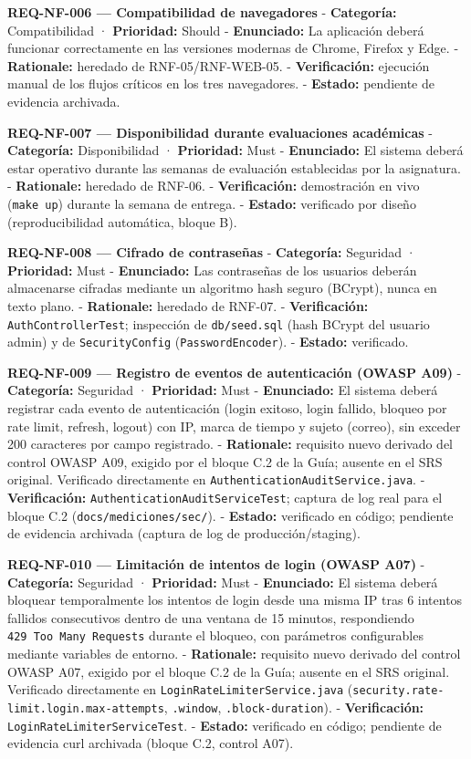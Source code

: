 \documentclass[
]{article}
\begin{document}
\textbf{REQ-NF-006 --- Compatibilidad de navegadores} -
\textbf{Categoría:} Compatibilidad · \textbf{Prioridad:} Should -
\textbf{Enunciado:} La aplicación deberá funcionar correctamente en las
versiones modernas de Chrome, Firefox y Edge. - \textbf{Rationale:}
heredado de RNF-05/RNF-WEB-05. - \textbf{Verificación:} ejecución manual
de los flujos críticos en los tres navegadores. - \textbf{Estado:}
pendiente de evidencia archivada.

\textbf{REQ-NF-007 --- Disponibilidad durante evaluaciones académicas} -
\textbf{Categoría:} Disponibilidad · \textbf{Prioridad:} Must -
\textbf{Enunciado:} El sistema deberá estar operativo durante las
semanas de evaluación establecidas por la asignatura. -
\textbf{Rationale:} heredado de RNF-06. - \textbf{Verificación:}
demostración en vivo (\texttt{make\ up}) durante la semana de entrega. -
\textbf{Estado:} verificado por diseño (reproducibilidad automática,
bloque B).

\textbf{REQ-NF-008 --- Cifrado de contraseñas} - \textbf{Categoría:}
Seguridad · \textbf{Prioridad:} Must - \textbf{Enunciado:} Las
contraseñas de los usuarios deberán almacenarse cifradas mediante un
algoritmo hash seguro (BCrypt), nunca en texto plano. -
\textbf{Rationale:} heredado de RNF-07. - \textbf{Verificación:}
\texttt{AuthControllerTest}; inspección de \texttt{db/seed.sql} (hash
BCrypt del usuario admin) y de \texttt{SecurityConfig}
(\texttt{PasswordEncoder}). - \textbf{Estado:} verificado.

\textbf{REQ-NF-009 --- Registro de eventos de autenticación (OWASP A09)}
- \textbf{Categoría:} Seguridad · \textbf{Prioridad:} Must -
\textbf{Enunciado:} El sistema deberá registrar cada evento de
autenticación (login exitoso, login fallido, bloqueo por rate limit,
refresh, logout) con IP, marca de tiempo y sujeto (correo), sin exceder
200 caracteres por campo registrado. - \textbf{Rationale:} requisito
nuevo derivado del control OWASP A09, exigido por el bloque C.2 de la
Guía; ausente en el SRS original. Verificado directamente en
\texttt{AuthenticationAuditService.java}. - \textbf{Verificación:}
\texttt{AuthenticationAuditServiceTest}; captura de log real para el
bloque C.2 (\texttt{docs/mediciones/sec/}). - \textbf{Estado:}
verificado en código; pendiente de evidencia archivada (captura de log
de producción/staging).

\textbf{REQ-NF-010 --- Limitación de intentos de login (OWASP A07)} -
\textbf{Categoría:} Seguridad · \textbf{Prioridad:} Must -
\textbf{Enunciado:} El sistema deberá bloquear temporalmente los
intentos de login desde una misma IP tras 6 intentos fallidos
consecutivos dentro de una ventana de 15 minutos, respondiendo
\texttt{429\ Too\ Many\ Requests} durante el bloqueo, con parámetros
configurables mediante variables de entorno. - \textbf{Rationale:}
requisito nuevo derivado del control OWASP A07, exigido por el bloque
C.2 de la Guía; ausente en el SRS original. Verificado directamente en
\texttt{LoginRateLimiterService.java}
(\texttt{security.rate-limit.login.max-attempts}, \texttt{.window},
\texttt{.block-duration}). - \textbf{Verificación:}
\texttt{LoginRateLimiterServiceTest}. - \textbf{Estado:} verificado en
código; pendiente de evidencia curl archivada (bloque C.2, control A07).
\end{document}
